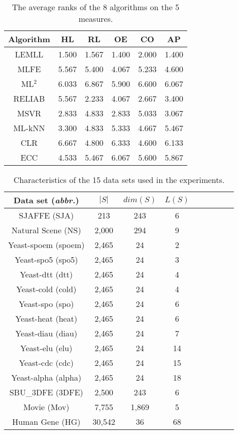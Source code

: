\documentclass[conference]{IEEEtran}
\begin{document}
\begin{table}[!htb]
\caption{The average ranks of the 8 algorithms on the 5 measures.}
\fontsize{7}{7}\selectfont
\center
\begin{tabular}{c c c c c c}
\midrule\midrule
Algorithm & HL & RL & OE & CO & AP \\
\midrule
LEMLL   &1.500	&1.567	&1.400	&2.000	&1.400\\
MLFE    &5.567	&5.400	&4.067	&5.233	&4.600\\
ML$^2$  &6.033	&6.867	&5.900	&6.600	&6.067\\
RELIAB  &5.567	&2.233	&4.067	&2.667	&3.400\\
MSVR    &2.833	&4.833	&2.833	&5.033	&3.067\\
ML-kNN  &3.300	&4.833	&5.333	&4.667	&5.467\\
CLR     &6.667	&4.800	&6.333	&4.600	&6.133\\
ECC     &4.533	&5.467	&6.067	&5.600	&5.867\\
\midrule\midrule
\end{tabular}
\end{table}


\begin{table}[!htb]
\caption{Characteristics of the 15 data sets used in the experiments.}
\fontsize{7}{7}\selectfont
\center
\begin{tabular}{c c c c c c c c c}
\midrule\midrule
Data set (\emph{abbr.}) & $|S|$ & $dim(S)$ & $L(S)$ \\
\midrule


SJAFFE (SJA) &213 &243 &6\\
Natural Scene (NS) &2,000 &294 &9\\
Yeast-spoem (spoem) &2,465 &24 &2\\
Yeast-spo5 (spo5) &2,465 &24 &3\\
Yeast-dtt (dtt) &2,465 &24 &4\\
Yeast-cold (cold) &2,465 &24 &4\\
Yeast-spo (spo) &2,465 &24 &6\\
Yeast-heat (heat) &2,465 &24 &6\\
Yeast-diau (diau) &2,465 &24 &7\\
Yeast-elu (elu) &2,465 &24 &14\\
Yeast-cdc (cdc) &2,465 &24 &15\\
Yeast-alpha (alpha) &2,465 &24 &18\\
SBU\_3DFE (3DFE) &2,500 &243 &6\\
Movie (Mov) &7,755 &1,869 &5\\
Human Gene (HG) &30,542 &36 &68\\
\midrule\midrule
\end{tabular}
\end{table}
\end{document}
